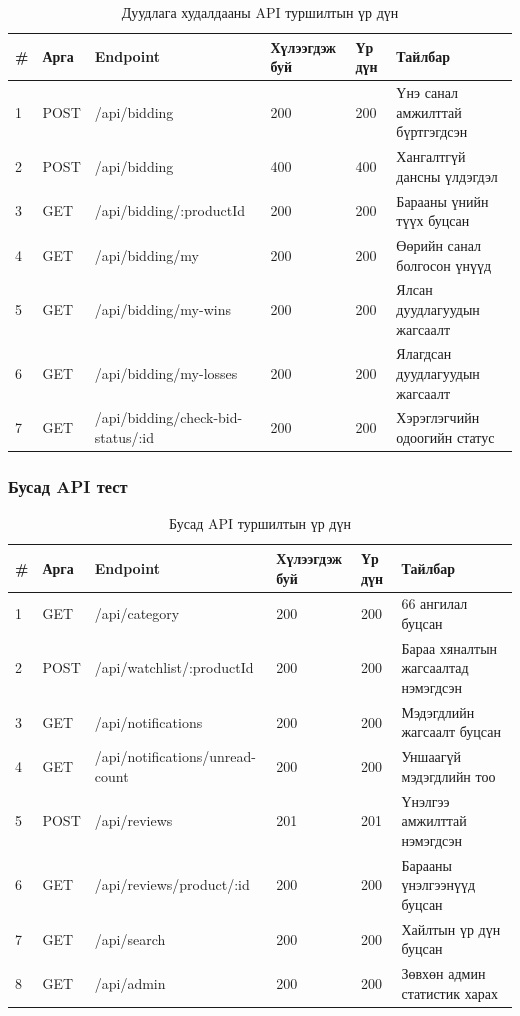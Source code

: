 \begin{table}[htbp]
\centering
\caption{Дуудлага худалдааны API туршилтын үр дүн}
\label{tab:bidding-api}
\begin{tabular}{|p{}|p{}|p{}|p{}|p{}|p{}|}
\hline
\textbf{\#} & \textbf{Арга} & \textbf{Endpoint} & \textbf{Хүлээгдэж буй} & \textbf{Үр дүн} & \textbf{Тайлбар} \\
\hline
1 & POST & /api/bidding & 200 & 200 & Үнэ санал амжилттай бүртгэгдсэн \\
\hline
2 & POST & /api/bidding & 400 & 400 & Хангалтгүй дансны үлдэгдэл \\
\hline
3 & GET & /api/bidding/:productId & 200 & 200 & Барааны үнийн түүх буцсан \\
\hline
4 & GET & /api/bidding/my & 200 & 200 & Өөрийн санал болгосон үнүүд \\
\hline
5 & GET & /api/bidding/my-wins & 200 & 200 & Ялсан дуудлагуудын жагсаалт \\
\hline
6 & GET & /api/bidding/my-losses & 200 & 200 & Ялагдсан дуудлагуудын жагсаалт \\
\hline
7 & GET & /api/bidding/check-bid-status/:id & 200 & 200 & Хэрэглэгчийн одоогийн статус \\
\hline
\end{tabular}
\end{table}

\subsubsection{Бусад API тест}

\begin{table}[htbp]
\centering
\caption{Бусад API туршилтын үр дүн}
\label{tab:other-api}
\begin{tabular}{|p{}|p{}|p{}|p{}|p{}|p{}|}
\hline
\textbf{\#} & \textbf{Арга} & \textbf{Endpoint} & \textbf{Хүлээгдэж буй} & \textbf{Үр дүн} & \textbf{Тайлбар} \\
\hline
1 & GET & /api/category & 200 & 200 & 66 ангилал буцсан \\
\hline
2 & POST & /api/watchlist/:productId & 200 & 200 & Бараа хяналтын жагсаалтад нэмэгдсэн \\
\hline
3 & GET & /api/notifications & 200 & 200 & Мэдэгдлийн жагсаалт буцсан \\
\hline
4 & GET & /api/notifications/unread-count & 200 & 200 & Уншаагүй мэдэгдлийн тоо \\
\hline
5 & POST & /api/reviews & 201 & 201 & Үнэлгээ амжилттай нэмэгдсэн \\
\hline
6 & GET & /api/reviews/product/:id & 200 & 200 & Барааны үнэлгээнүүд буцсан \\
\hline
7 & GET & /api/search & 200 & 200 & Хайлтын үр дүн буцсан \\
\hline
8 & GET & /api/admin & 200 & 200 & Зөвхөн админ статистик харах \\
\hline
\end{tabular}
\end{table}

